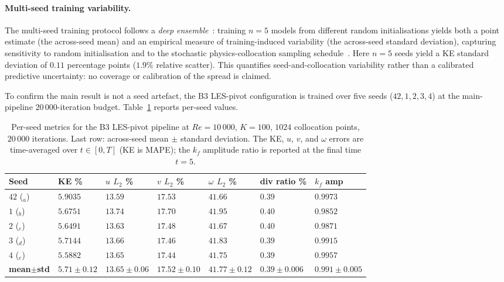 \paragraph{Multi-seed training variability.}
The multi-seed training protocol follows a \emph{deep ensemble}~\cite{Lakshminarayanan2017DeepEnsembles}: training $n=5$ models from different random initialisations yields both a point estimate (the across-seed mean) and an empirical measure of training-induced variability (the across-seed standard deviation), capturing sensitivity to random initialisation and to the stochastic physics-collocation sampling schedule~\cite{Psaros2023UQ}. Here $n=5$ seeds yield a KE standard deviation of $0.11$ percentage points ($1.9\%$ relative scatter). This quantifies seed-and-collocation variability rather than a calibrated predictive uncertainty: no coverage or calibration of the spread is claimed.

To confirm the main result is not a seed artefact, the B3 LES-pivot configuration is trained over five seeds ($42, 1, 2, 3, 4$) at the main-pipeline $20\,000$-iteration budget. Table~\ref{tab:multiseed} reports per-seed values.

\begin{table}[!htbp]
    \centering
    \caption{Per-seed metrics for the B3 LES-pivot pipeline at $Re=10\,000$, $K=100$, $1024$ collocation points, $20\,000$ iterations. Last row: across-seed mean $\pm$ standard deviation. The KE, $u$, $v$, and $\omega$ errors are time-averaged over $t\in[0,T]$ (KE is MAPE); the $k_f$ amplitude ratio is reported at the final time $t=5$.}
    \label{tab:multiseed}
    \footnotesize
    \setlength{\tabcolsep}{3pt}
    \begin{tabularx}{\textwidth}{
        >{\raggedright\arraybackslash}p{1.6cm}
        >{\centering\arraybackslash}X
        >{\centering\arraybackslash}X
        >{\centering\arraybackslash}X
        >{\centering\arraybackslash}X
        >{\centering\arraybackslash}X
        >{\centering\arraybackslash}X
    }
    \toprule
    \textbf{Seed} & \textbf{KE \%} & \textbf{$u$ $L_2$ \%} & \textbf{$v$ $L_2$ \%} & \textbf{$\omega$ $L_2$ \%} & \textbf{div ratio \%} & \textbf{$k_f$ amp} \\
    \midrule
    $42$ ($_a$) & $5.9035$ & $13.59$ & $17.53$ & $41.66$ & $0.39$ & $0.9973$ \\
    $1$  ($_b$) & $5.6751$ & $13.74$ & $17.70$ & $41.95$ & $0.40$ & $0.9852$ \\
    $2$  ($_c$) & $5.6491$ & $13.63$ & $17.48$ & $41.67$ & $0.40$ & $0.9871$ \\
    $3$  ($_d$) & $5.7144$ & $13.66$ & $17.46$ & $41.83$ & $0.39$ & $0.9915$ \\
    $4$  ($_e$) & $5.5882$ & $13.65$ & $17.44$ & $41.75$ & $0.39$ & $0.9957$ \\
    \midrule
    \textbf{mean$\pm$std} & $\mathbf{5.71 {\pm} 0.12}$ & $\mathbf{13.65 {\pm} 0.06}$ & $\mathbf{17.52 {\pm} 0.10}$ & $\mathbf{41.77 {\pm} 0.12}$ & $\mathbf{0.39 {\pm} 0.006}$ & $\mathbf{0.991 {\pm} 0.005}$ \\
    \bottomrule
    \end{tabularx}
\end{table}

